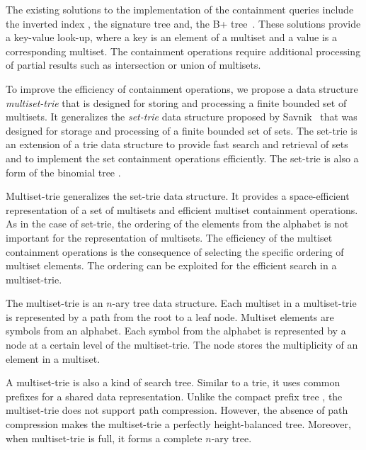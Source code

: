 The existing solutions to the implementation of the containment queries include the inverted index \cite{zobel1992efficient,zobel1998inverted,broder2006indexing}, the signature tree \cite{tousidou2002sigstruc,yangjun2005stree,zobel1998inverted} and, the B+ tree~\cite{Helmer2003}. These solutions provide a key-value look-up, where a key is an element of a multiset and a value is a corresponding multiset. The containment operations require additional processing of partial results such as intersection or union of multisets.

To improve the efficiency of containment operations, we propose a data structure \emph{multiset-trie} that is designed for storing and processing a finite bounded set of multisets. It generalizes the \emph{set-trie} data structure proposed by Savnik~\cite{savnik2013index,savnik2021plos} that was designed for storage and processing of a finite bounded set of sets. 
The set-trie is an extension of a trie data structure to provide fast search and retrieval of sets and to implement the set containment operations efficiently. The set-trie is also a form of the binomial tree \cite{corman2001}.

Multiset-trie generalizes the set-trie data structure. It provides a space-efficient representation of a set of multisets and efficient multiset containment operations. As in the case of set-trie, the ordering of the elements from the alphabet is not important for the representation of multisets. The efficiency of the multiset containment operations is the consequence of selecting the specific ordering of multiset elements. The ordering can be exploited for the efficient search in a multiset-trie.  

The multiset-trie is an $n$-ary tree data structure. Each multiset in a multiset-trie is represented by a path from the root to a leaf node. Multiset elements are symbols from an alphabet. Each symbol from the alphabet is represented by a node at a certain level of the multiset-trie. The node stores the multiplicity of an element in a multiset.

A multiset-trie is also a kind of search tree. Similar to a trie, it uses common prefixes for a shared data representation. Unlike the compact prefix tree \cite{Sedgewick:2011:ALG:2011916}, the multiset-trie does not support path compression. However, the absence of path compression makes the multiset-trie a perfectly height-balanced tree. Moreover, when multiset-trie is full, it forms a complete $n$-ary tree.

